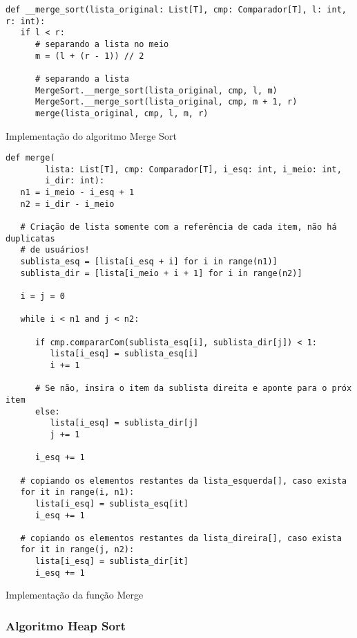 \documentclass[a4paper,12pt]{scrartcl}
\begin{document}
\begin{listing}[H]
\begin{verbatim}
def __merge_sort(lista_original: List[T], cmp: Comparador[T], l: int, r: int):
   if l < r:
      # separando a lista no meio
      m = (l + (r - 1)) // 2

      # separando a lista
      MergeSort.__merge_sort(lista_original, cmp, l, m)
      MergeSort.__merge_sort(lista_original, cmp, m + 1, r)
      merge(lista_original, cmp, l, m, r)
\end{verbatim}
\caption{\footnotesize{Implementação do algoritmo Merge Sort}}
\end{listing}

\begin{listing}[H]
\begin{verbatim}
def merge(
        lista: List[T], cmp: Comparador[T], i_esq: int, i_meio: int,
        i_dir: int):
   n1 = i_meio - i_esq + 1
   n2 = i_dir - i_meio

   # Criação de lista somente com a referência de cada item, não há duplicatas
   # de usuários!
   sublista_esq = [lista[i_esq + i] for i in range(n1)]
   sublista_dir = [lista[i_meio + i + 1] for i in range(n2)]

   i = j = 0

   while i < n1 and j < n2:

      if cmp.compararCom(sublista_esq[i], sublista_dir[j]) < 1:
         lista[i_esq] = sublista_esq[i]
         i += 1

      # Se não, insira o item da sublista direita e aponte para o próx item
      else:
         lista[i_esq] = sublista_dir[j]
         j += 1

      i_esq += 1

   # copiando os elementos restantes da lista_esquerda[], caso exista
   for it in range(i, n1):
      lista[i_esq] = sublista_esq[it]
      i_esq += 1

   # copiando os elementos restantes da lista_direira[], caso exista
   for it in range(j, n2):
      lista[i_esq] = sublista_dir[it]
      i_esq += 1
\end{verbatim}
\caption{\footnotesize{Implementação da função Merge}}
\end{listing}

\subsubsection{Algoritmo Heap Sort}
\end{document}
